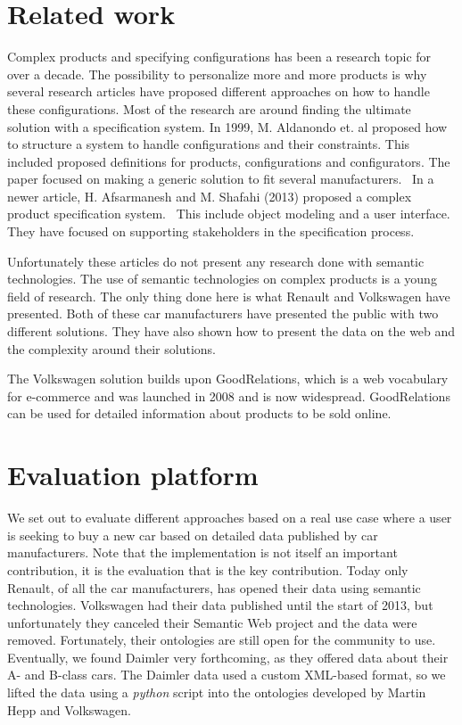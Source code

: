 \documentclass{llncs}
\begin{document}
\section{Related work}
Complex products and specifying configurations has been a research
topic for over a decade.  The possibility to personalize more and more
products is why several research articles have proposed different
approaches on how to handle these configurations. Most of the research
are around finding the ultimate solution with a specification
system. In 1999, M. Aldanondo et. al proposed how to structure a
system to handle configurations and their constraints. This included
proposed definitions for products, configurations and
configurators. The paper focused on making a generic solution to fit
several manufacturers.~\cite{OldConf} In a newer article,
H. Afsarmanesh and M. Shafahi (2013) proposed a complex product
specification system.~\cite{NewConf} This include object modeling and
a user interface. They have focused on supporting stakeholders in the
specification process.

Unfortunately these articles do not present any research done with
semantic technologies. The use of semantic technologies on complex
products is a young field of research. The only thing done here is
what Renault and Volkswagen have presented. Both of these car
manufacturers have presented the public with two different
solutions. They have also shown how to present the data on the web and
the complexity around their solutions.

The Volkswagen solution builds upon GoodRelations\cite{GRQual}, which
is a web vocabulary for e-commerce and was launched in 2008 and is now
widespread.  GoodRelations can be used for detailed information about
products to be sold online.


\section{Evaluation platform}

We set out to evaluate different approaches based on a real use case
where a user is seeking to buy a new car based on detailed data
published by car manufacturers. Note that the implementation is not
itself an important contribution, it is the evaluation that is the key
contribution. Today only Renault, of all the car manufacturers, has
opened their data using semantic technologies. Volkswagen had their
data published until the start of 2013, but unfortunately they
canceled their Semantic Web project and the data were removed.
Fortunately, their ontologies are still open for the community to
use. Eventually, we found Daimler very forthcoming, as they offered
data about their A- and B-class cars.  The Daimler data used a custom
XML-based format, so we lifted the data using a \textit{python} script into the
ontologies developed by Martin Hepp and Volkswagen.
\end{document}
